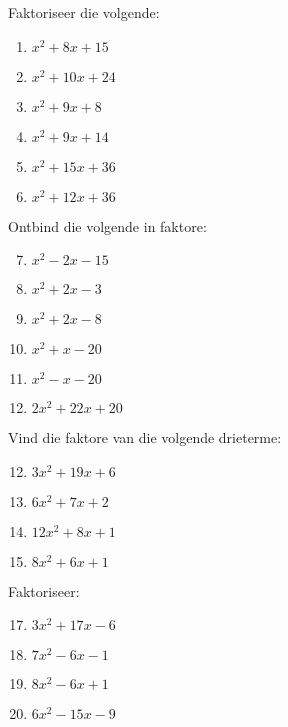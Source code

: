 \begin{exercises}{}
{
Faktoriseer die volgende:
\begin{multicols}{2}
\begin{enumerate}[itemsep=5pt, label=\textbf{\arabic*}. ] 
\item ${x}^{2}+8x+15$
\item ${x}^{2}+10x+24$
\item ${x}^{2}+9x+8$
\item ${x}^{2}+9x+14$
\item ${x}^{2}+15x+36$
\item ${x}^{2}+12x+36$
\end{enumerate}
\end{multicols}


Ontbind die volgende in faktore:
\begin{multicols}{2}
\begin{enumerate}[itemsep=5pt, label=\textbf{\arabic*}. ] 
\setcounter{enumi}{6}
\item ${x}^{2}-2x-15$
\item ${x}^{2}+2x-3$
\item ${x}^{2}+2x-8$
\item ${x}^{2}+x-20$
\item ${x}^{2}-x-20$
\item $2{x}^{2}+22x+20$
\end{enumerate}
\end{multicols}


Vind die faktore van die volgende drieterme:
\begin{multicols}{2}
\begin{enumerate}[itemsep=5pt, label=\textbf{\arabic*}. ] 
\setcounter{enumi}{11}

\item $3{x}^{2}+19x+6$
\item $6{x}^{2}+7x+2$
\item $12{x}^{2}+8x+1$
\item $8{x}^{2}+6x+1$
\end{enumerate}
\end{multicols}

Faktoriseer:
\begin{multicols}{2}
\begin{enumerate}[itemsep=5pt, label=\textbf{\arabic*}. ] 
\setcounter{enumi}{16}
\item $3{x}^{2}+17x-6$
\item $7{x}^{2}-6x-1$
\item $8{x}^{2}-6x+1$
\item $6{x}^{2}-15x-9$
\end{enumerate}
\end{multicols}

}
\end{exercises}



